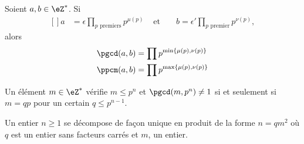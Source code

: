 \begin{proposition}     \label{PROPooNQBOooHWqTvs}
    Soient \( a,b\in\eZ^*\). Si
    \begin{equation}
        \begin{aligned}[]
            a&=\epsilon\prod_{ p\text{ premiers}}p^{\mu(p)}&\text{ et }&&b=\epsilon'\prod_{ p\text{ premier}}p^{\nu(p)},
        \end{aligned}
    \end{equation}
    alors
    \begin{subequations}
        \begin{align}
            \pgcd(a,b)&=\prod p^{\min\{ \mu(p),\nu(p) \}}\\
            \ppcm(a,b)&=\prod p^{\max\{ \mu(p),\nu(p) \}}
        \end{align}
    \end{subequations}
\end{proposition}

\begin{corollary}  \label{CORooQIMHooUzLUJY}
    Un élément \( m\in \eZ^*\) vérifie \( m\leq p^n\) et \( \pgcd(m,p^n)\neq 1\) si et seulement si \( m=qp\) pour un certain \( q\leq p^{n-1}\).
\end{corollary}

\begin{lemma}   \label{LemheKdsa}
    Un entier \( n\geq 1\) se décompose de façon unique en produit de la forme \( n=qm^2\) où \( q\) est un entier sans facteurs carrés et \( m\), un entier.
\end{lemma}

